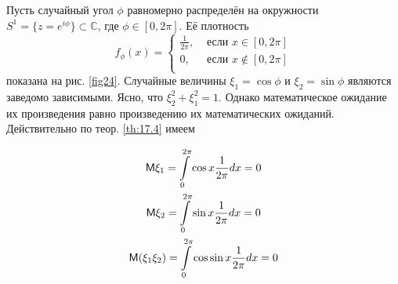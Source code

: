 \begin{example}
	Пусть случайный угол $\phi$ равномерно распределён на окружности 
	$S^1 = \{z = e^{i\phi}\} \subset \mathbb{C} $, где $\phi\in [0, 2\pi]$. Её плотность
	\begin{equation*}
		f_{\phi}(x)=
		\begin{cases}
			\frac{1}{2\pi}, &\text{ если } x\in [0,2\pi]\\
			0, &\text{ если } x\notin [0,2\pi]\\
		\end{cases}
	\end{equation*}
	показана на рис. \ref{fig24}. Случайные величины $\xi_1 = \cos\phi$ и $\xi_2 = \sin\phi$ являются заведомо зависимыми. Ясно, что $\xi_2^2+\xi_1^2=1$. Однако математическое ожидание их произведения равно произведению их математических ожиданий.
	Действительно по теор. \ref{th:17.4} имеем

	\begin{gather*}
		\mathsf{M}\xi_1=\int\limits_0^{2\pi}\cos x\frac{1}{2\pi}dx=0 
		\\
		\mathsf{M}\xi_2=\int\limits_0^{2\pi}\sin x\frac{1}{2\pi}dx=0
		\\
		\mathsf{M}(\xi_1\xi_2)=\int\limits_0^{2\pi}\cos\sin x\frac{1}{2\pi}dx=0
	\end{gather*}
\end{example}